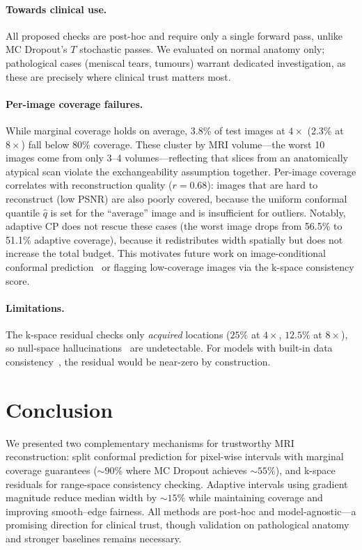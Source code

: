 \documentclass[runningheads]{llncs}
\begin{document}
\paragraph{Towards clinical use.} All proposed checks are post-hoc and require only a single forward pass, unlike MC Dropout's $T$ stochastic passes. We evaluated on normal anatomy only; pathological cases (meniscal tears, tumours) warrant dedicated investigation, as these are precisely where clinical trust matters most.

\paragraph{Per-image coverage failures.} While marginal coverage holds on average, 3.8\% of test images at $4{\times}$ (2.3\% at $8{\times}$) fall below 80\% coverage. These cluster by MRI volume---the worst 10 images come from only 3--4 volumes---reflecting that slices from an anatomically atypical scan violate the exchangeability assumption together. Per-image coverage correlates with reconstruction quality ($r{=}0.68$): images that are hard to reconstruct (low PSNR) are also poorly covered, because the uniform conformal quantile $\hat{q}$ is set for the ``average'' image and is insufficient for outliers. Notably, adaptive CP does not rescue these cases (the worst image drops from 56.5\% to 51.1\% adaptive coverage), because it redistributes width spatially but does not increase the total budget. This motivates future work on image-conditional conformal prediction~\cite{angelopoulos2023gentle} or flagging low-coverage images via the k-space consistency score.

\paragraph{Limitations.} The k-space residual checks only \emph{acquired} locations ($25\%$ at $4{\times}$, $12.5\%$ at $8{\times}$), so null-space hallucinations~\cite{bhadra2021hallucinations} are undetectable. For models with built-in data consistency~\cite{hammernik2018varnet,schlemper2018cascade}, the residual would be near-zero by construction.

\section{Conclusion}

We presented two complementary mechanisms for trustworthy MRI reconstruction: split conformal prediction for pixel-wise intervals with marginal coverage guarantees (${\sim}90\%$ where MC Dropout achieves ${\sim}55\%$), and k-space residuals for range-space consistency checking. Adaptive intervals using gradient magnitude reduce median width by ${\sim}15\%$ while maintaining coverage and improving smooth--edge fairness. All methods are post-hoc and model-agnostic---a promising direction for clinical trust, though validation on pathological anatomy and stronger baselines remains necessary.



\end{document}
